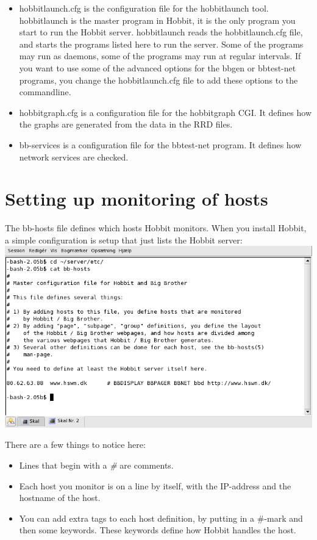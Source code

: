 \begin{itemize}
\item hobbitlaunch.cfg is the configuration file for the hobbitlaunch
  tool. hobbitlaunch is the master program in Hobbit, it is the only
  program you start to run the Hobbit server. hobbitlaunch reads the
  hobbitlaunch.cfg file, and starts the programs listed here to run
  the server. Some of the programs may run as daemons, some of the
  programs may run at regular intervals. If you want to use some of
  the advanced options for the bbgen or bbtest-net programs, you
  change the hobbitlaunch.cfg file to add these options to the
  commandline.

\item hobbitgraph.cfg is a configuration file for the hobbitgraph
  CGI. It defines how the graphs are generated from the data in the
  RRD files.

\item bb-services is a configuration file for the bbtest-net
  program. It defines how network services are checked.


\end{itemize}

\section{Setting up monitoring of hosts}


 The bb-hosts file defines which hosts Hobbit monitors. When you
 install Hobbit, a simple configuration is setup that just lists the
 Hobbit server:\\ 

\includegraphics[scale=1]{./hobbit-bbhosts.png} 


 There are a few things to notice here:
\begin{itemize}
\item Lines that begin with a \emph{\#}
 are comments.
\item Each host you monitor is on a line by itself, with the IP-address and the hostname of the host.
\item You can add extra tags to each host definition, by putting in a \#-mark and then some keywords. These keywords define how Hobbit handles the host.

\end{itemize}


